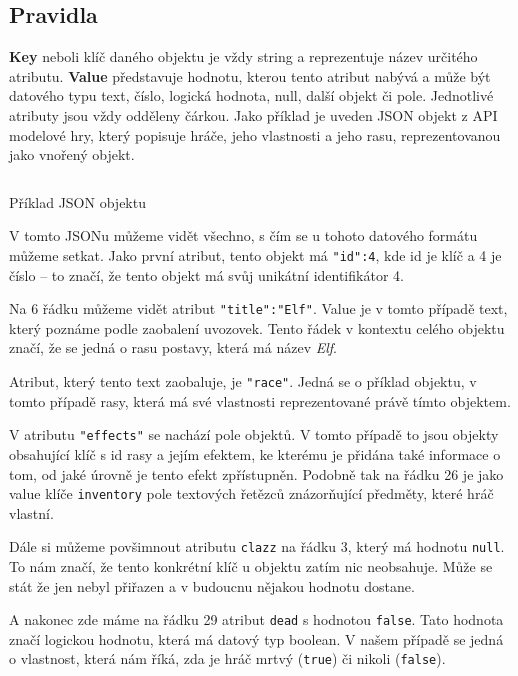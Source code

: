 \subsection{Pravidla}
\textbf{Key} neboli klíč daného objektu je vždy string a reprezentuje název určitého atributu. \textbf{Value} představuje hodnotu, kterou tento atribut nabývá a může být datového typu text, číslo, logická hodnota, null, další objekt či pole. Jednotlivé atributy jsou vždy odděleny čárkou. Jako příklad je uveden JSON objekt z API modelové hry, který popisuje hráče, jeho vlastnosti a jeho rasu, reprezentovanou jako vnořený objekt.

\begin{listing}[H]
  \inputminted{json}{resources/code/standards/player.json}
  \caption{Příklad JSON objektu}
  \label{code:json_player}
\end{listing}

V tomto JSONu můžeme vidět všechno, s čím se u tohoto datového formátu můžeme setkat. Jako první atribut, tento objekt má \verb|"id":4|, kde id je klíč a 4 je číslo -- to značí, že tento objekt má svůj unikátní identifikátor 4.

Na 6 řádku můžeme vidět atribut \verb|"title":"Elf"|. Value je v tomto případě text, který poznáme podle zaobalení uvozovek. Tento řádek v kontextu celého objektu značí, že se jedná o rasu postavy, která má název \textit{Elf}.

Atribut, který tento text zaobaluje, je \texttt{"race"}. Jedná se o příklad objektu, v tomto případě rasy, která má své vlastnosti reprezentované právě tímto objektem.

V atributu \texttt{"effects"} se nachází pole objektů. V tomto případě to jsou objekty obsahující klíč s id rasy a jejím efektem, ke kterému je přidána také informace o tom, od jaké úrovně je tento efekt zpřístupněn. Podobně tak na řádku 26 je jako value klíče \texttt{inventory} pole textových řetězců znázorňující předměty, které hráč vlastní.

Dále si můžeme povšimnout atributu \texttt{clazz} na řádku 3, který má hodnotu \texttt{null}. To nám značí, že tento konkrétní klíč u objektu zatím nic neobsahuje. Může se stát že jen nebyl přiřazen a v budoucnu nějakou hodnotu dostane.

A nakonec zde máme na řádku 29 atribut \texttt{dead} s hodnotou \texttt{false}. Tato hodnota značí logickou hodnotu, která má datový typ boolean. V našem případě se jedná o vlastnost, která nám říká, zda je hráč mrtvý (\texttt{true}) či nikoli (\texttt{false}).


